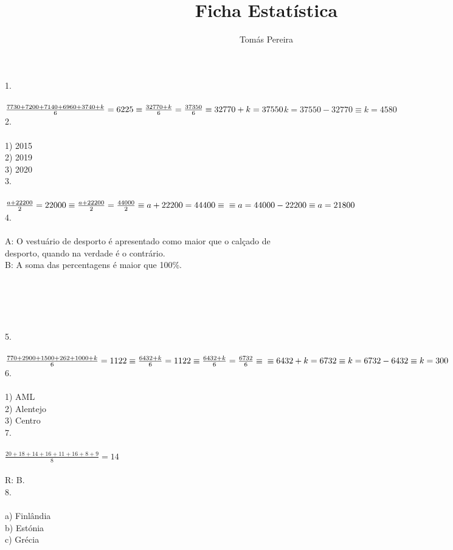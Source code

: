 \documentclass[12pt]{article}
\title{Ficha Estatística}
\author{Tomás Pereira}
\begin{document}
\maketitle

1.\\\\
$\frac{7730+7200+7140+6960+3740+k}{6}=6225\equiv\frac{32770+k}{6}=\frac{37350}{6}\equiv32770+k=37550\\$$k=37550-32770\equiv k=4580$\\

2.\\\\
1) 2015\\
2) 2019\\
3) 2020\\

3.\\\\
$\frac{a+22200}{2}=22000\equiv\frac{a+22200}{2}=\frac{44000}{2}\equiv a+22200=44400\equiv\\ \equiv a=44000-22200\equiv a=21800$\\

4.\\\\
A: O vestuário de desporto é apresentado como maior que o calçado de\\desporto, quando na verdade é o contrário.\\
B: A soma das percentagens é maior que 100\%.\\\\\\\\\\\\

5.\\\\
$\frac{770+2900+1500+262+1000+k}{6}=1122\equiv\frac{6432+k}{6}=1122\equiv\frac{6432+k}{6}=\frac{6732}{6}\equiv\\\equiv6432+k=6732\equiv k=6732-6432\equiv k=300$\\

6.\\\\
1) AML\\
2) Alentejo\\
3) Centro\\

7.\\\\
$\frac{20+18+14+16+11+16+8+9}{8}=14$\\\\
R: B.\\

8.\\\\
a) Finlândia\\
b) Estónia\\
c) Grécia\\
\end{document}
